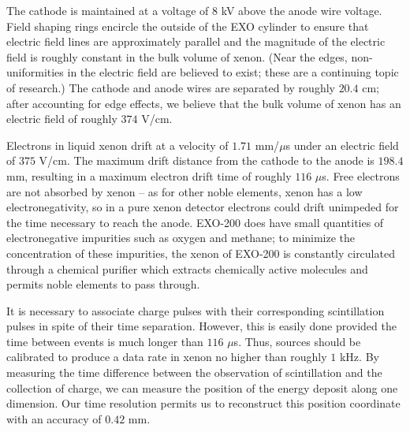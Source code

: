 The cathode is maintained at a voltage of $8$ kV above the anode wire voltage.  Field shaping rings encircle the outside of the EXO cylinder to ensure that electric field lines are approximately parallel and the magnitude of the electric field is roughly constant in the bulk volume of xenon.  (Near the edges, non-uniformities in the electric field are believed to exist; these are a continuing topic of research.)  The cathode and anode wires are separated by roughly $20.4$ cm; after accounting for edge effects, we believe that the bulk volume of xenon has an electric field of roughly $374$ V/cm.

Electrons in liquid xenon drift at a velocity of $1.71$ mm/$\mu$s under an electric field of $375$ V/cm.  The maximum drift distance from the cathode to the anode is $198.4$ mm, resulting in a maximum electron drift time of roughly $116$ $\mu$s.  Free electrons are not absorbed by xenon -- as for other noble elements, xenon has a low electronegativity, so in a pure xenon detector electrons could drift unimpeded for the time necessary to reach the anode.  EXO-200 does have small quantities of electronegative impurities such as oxygen and methane; to minimize the concentration of these impurities, the xenon of EXO-200 is constantly circulated through a chemical purifier which extracts chemically active molecules and permits noble elements to pass through.~\cite{detectorPartI}

It is necessary to associate charge pulses with their corresponding scintillation pulses in spite of their time separation.  However, this is easily done provided the time between events is much longer than $116$ $\mu$s.  Thus, sources should be calibrated to produce a data rate in xenon no higher than roughly $1$ kHz.  By measuring the time difference between the observation of scintillation and the collection of charge, we can measure the position of the energy deposit along one dimension.  Our time resolution permits us to reconstruct this position coordinate with an accuracy of $0.42$ mm.~\cite{bb2nEXO2014}

